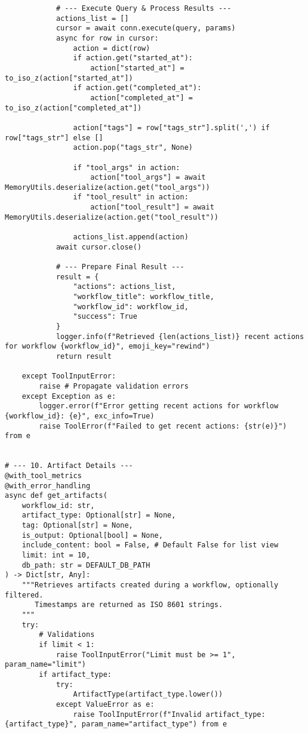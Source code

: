 \documentclass[12pt,a4paper]{article}
\begin{document}
\begin{pageablecode}
\begin{verbatim}
            # --- Execute Query & Process Results ---
            actions_list = []
            cursor = await conn.execute(query, params)
            async for row in cursor:
                action = dict(row)
                if action.get("started_at"):
                    action["started_at"] = to_iso_z(action["started_at"])
                if action.get("completed_at"):
                    action["completed_at"] = to_iso_z(action["completed_at"])

                action["tags"] = row["tags_str"].split(',') if row["tags_str"] else []
                action.pop("tags_str", None)

                if "tool_args" in action: 
                    action["tool_args"] = await MemoryUtils.deserialize(action.get("tool_args"))
                if "tool_result" in action: 
                    action["tool_result"] = await MemoryUtils.deserialize(action.get("tool_result"))

                actions_list.append(action)
            await cursor.close()

            # --- Prepare Final Result ---
            result = {
                "actions": actions_list,
                "workflow_title": workflow_title,
                "workflow_id": workflow_id,
                "success": True
            }
            logger.info(f"Retrieved {len(actions_list)} recent actions for workflow {workflow_id}", emoji_key="rewind")
            return result

    except ToolInputError:
        raise # Propagate validation errors
    except Exception as e:
        logger.error(f"Error getting recent actions for workflow {workflow_id}: {e}", exc_info=True)
        raise ToolError(f"Failed to get recent actions: {str(e)}") from e


# --- 10. Artifact Details ---
@with_tool_metrics
@with_error_handling
async def get_artifacts(
    workflow_id: str,
    artifact_type: Optional[str] = None,
    tag: Optional[str] = None,
    is_output: Optional[bool] = None,
    include_content: bool = False, # Default False for list view
    limit: int = 10,
    db_path: str = DEFAULT_DB_PATH
) -> Dict[str, Any]:
    """Retrieves artifacts created during a workflow, optionally filtered.
       Timestamps are returned as ISO 8601 strings.
    """
    try:
        # Validations
        if limit < 1: 
            raise ToolInputError("Limit must be >= 1", param_name="limit")
        if artifact_type:
            try:
                ArtifactType(artifact_type.lower())
            except ValueError as e: 
                raise ToolInputError(f"Invalid artifact_type: {artifact_type}", param_name="artifact_type") from e


\end{verbatim}
\end{pageablecode}
\end{document}
